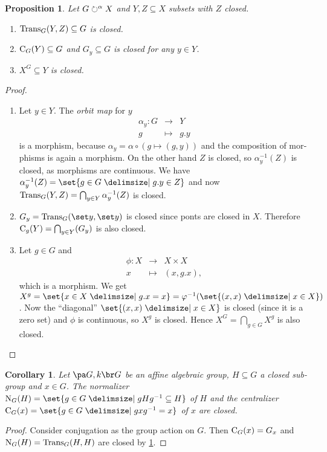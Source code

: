 \documentclass[12pt,a4paper]{scrartcl}
\theoremstyle{cplain}
\newtheorem{cor}[thmcounter]{Corollary}
\theoremstyle{cplain}
\theoremstyle{cplain}
\newtheorem{prop}[thmcounter]{Proposition}
\theoremstyle{definition}
\begin{document}
\begin{otherlanguage}{english}
\begin{prop} \label{prop:IX.2}
  Let $G \circlearrowright^\alpha X$ and $Y,Z \subseteq X$ subsets with $Z$ closed.
  \begin{enumerate}
  \item \label{prop:IX.2:1} $\operatorname{Trans}_G(Y,Z) \subseteq G$ is closed.
  \item \label{prop:IX.2:2} $\operatorname{C}_G(Y) \subseteq G$ and $G_y \subseteq G$ is closed for any $y \in Y$.
  \item \label{prop:IX.2:3} $X^G\subseteq Y$ is closed.
  \end{enumerate}
\end{prop}
\begin{proof}
  \leavevmode
  \begin{enumerate}[label=\ref{prop:IX.2:\arabic*}]
  \item Let $y \in Y$. The \emph{orbit map} for $y$
    \begin{eqnarray*}
      \alpha_y\colon G &\to& Y\\
      g &\mapsto& g.y
    \end{eqnarray*}
    is a morphism, because $\alpha_y = \alpha \circ (g \mapsto (g,y))$ and the composition of morphisms is again a morphism. On the other hand $Z$ is closed, so $\alpha_y^{-1}(Z)$ is closed, as morphisms are continuous. We have $\alpha_y^{-1}(Z) = \set{g\in G \given g.y\in Z}$ and now $\operatorname{Trans}_G(Y,Z) = \bigcap_{y\in Y} \alpha_y^{-1}(Z)$ is closed.
  \item $G_y = \Trans_G(\set y,\set y)$ is closed since ponts are closed in $X$. Therefore $\operatorname{C}_g(Y) = \bigcap_{y\in Y}(G_y)$ is also closed.
  \item
    Let $g\in G$ and \begin{eqnarray*}\phi\colon X &\to& X \times X\\x &\mapsto& (x,g.x),\end{eqnarray*} which is a morphism. We get $X^g = \set{x\in X \given g.x = x} = \phi^{-1}(\set{(x,x)\given x\in X})$. Now the \enquote{diagonal} $\set{(x,x)\given x\in X}$ is closed (since it is a zero set) and $\phi$ is continuous, so $X^g$ is closed. Hence $X^G = \bigcap_{g\in G}X^g$ is also closed.
  \qedhere
  \end{enumerate}
\end{proof}

\begin{cor}
  Let $\aav G$ be an affine algebraic group, $H \subseteq G$ a closed subgroup and $x\in G$. The normalizer $\N_G(H) = \set{g\in G \given gHg^{-1} \subseteq H}$ of $H$ and the centralizer $\C_G(x) = \set{g \in G \given gxg^{-1} = x}$ of $x$ are closed.
\end{cor}
\begin{proof}
  Consider conjugation as the group action on $G$. Then $\operatorname{C}_G(x) =G_x$ and $\operatorname{N}_G(H) = \operatorname{Trans}_G(H,H)$ are closed by \cref{prop:IX.2}.
\end{proof}


\end{otherlanguage}
\end{document}
